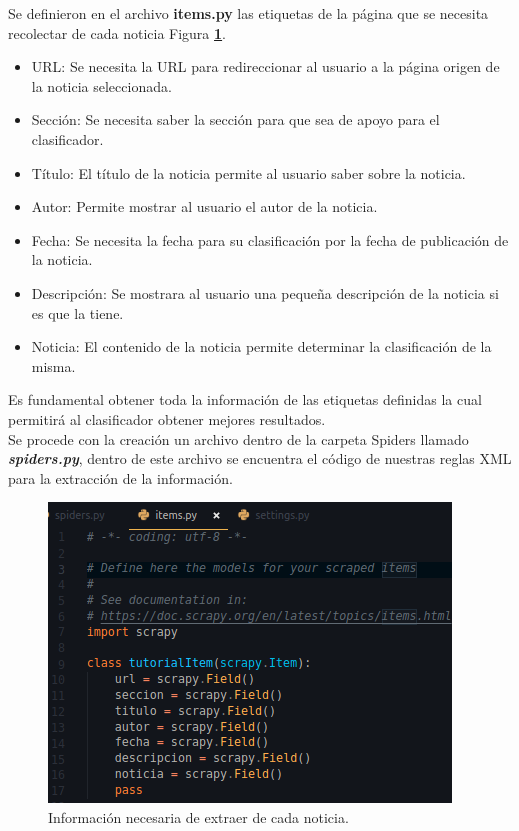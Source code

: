 Se definieron en el archivo \textbf{items.py} las etiquetas de la página que se necesita recolectar de cada noticia Figura \textbf{\ref{fig:cinco}}. 
\\
\begin{itemize}
  \item URL: Se necesita la URL para redireccionar al usuario a la página origen de la noticia seleccionada.
  \item Sección: Se necesita saber la sección para que sea de apoyo para el clasificador.
  \item Título: El título de la noticia permite al usuario saber sobre la noticia.
  \item Autor: Permite mostrar al usuario el autor de la noticia.
  \item Fecha: Se necesita la fecha para su clasificación por la fecha de publicación de la noticia.
  \item Descripción: Se mostrara al usuario una pequeña descripción de la noticia si es que la tiene.
  \item Noticia: El contenido de la noticia permite determinar la clasificación de la misma.
\end{itemize}
Es fundamental obtener toda la información de las etiquetas definidas la cual permitirá al clasificador obtener mejores resultados.
\\
Se procede con la creación un archivo dentro de la carpeta Spiders llamado \textbf{\textit{spiders.py}}, dentro de este archivo se encuentra el código 
de nuestras reglas XML para la extracción de la información.

\begin{figure}[H]
  \centering
  \includegraphics[scale=.45]{imagenes/Capitulo5/5}
  \caption{Información necesaria de extraer de cada noticia.}
  \label{fig:cinco}
\end{figure}

